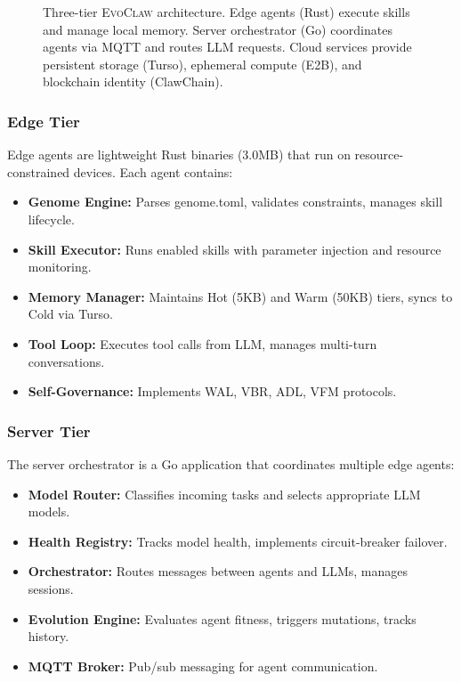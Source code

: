 \documentclass{article}
\newcommand{\evoclaw}{\textsc{EvoClaw}}
\begin{document}
\begin{figure}[t]
\caption{Three-tier \evoclaw{} architecture. Edge agents (Rust) execute skills and manage local memory. Server orchestrator (Go) coordinates agents via MQTT and routes LLM requests. Cloud services provide persistent storage (Turso), ephemeral compute (E2B), and blockchain identity (ClawChain).}
\label{fig:architecture}
\end{figure}

\subsubsection{Edge Tier}

Edge agents are lightweight Rust binaries (3.0MB) that run on resource-constrained devices. Each agent contains:

\begin{itemize}[leftmargin=*]
    \item \textbf{Genome Engine:} Parses genome.toml, validates constraints, manages skill lifecycle.
    \item \textbf{Skill Executor:} Runs enabled skills with parameter injection and resource monitoring.
    \item \textbf{Memory Manager:} Maintains Hot (5KB) and Warm (50KB) tiers, syncs to Cold via Turso.
    \item \textbf{Tool Loop:} Executes tool calls from LLM, manages multi-turn conversations.
    \item \textbf{Self-Governance:} Implements WAL, VBR, ADL, VFM protocols.
\end{itemize}

\subsubsection{Server Tier}

The server orchestrator is a Go application that coordinates multiple edge agents:

\begin{itemize}[leftmargin=*]
    \item \textbf{Model Router:} Classifies incoming tasks and selects appropriate LLM models.
    \item \textbf{Health Registry:} Tracks model health, implements circuit-breaker failover.
    \item \textbf{Orchestrator:} Routes messages between agents and LLMs, manages sessions.
    \item \textbf{Evolution Engine:} Evaluates agent fitness, triggers mutations, tracks history.
    \item \textbf{MQTT Broker:} Pub/sub messaging for agent communication.
\end{itemize}
\end{document}
